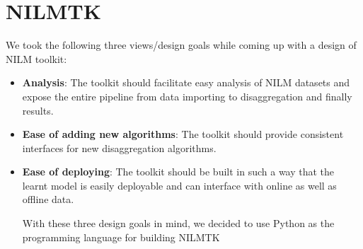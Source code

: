 \documentclass{sig-alternate}
\begin{document}
\section{NILMTK}
We took the following three views/design goals while coming up with a design of NILM toolkit:
\begin{itemize}
\item \textbf{Analysis}: The toolkit should facilitate easy analysis of NILM datasets and expose the entire pipeline from data importing to disaggregation and finally results. 
\item \textbf{Ease of adding new algorithms}: The toolkit should provide consistent interfaces for new disaggregation algorithms.
\item \textbf{Ease of deploying}: The toolkit should be built in such a way that the learnt model is easily deployable and can interface with online as well as offline data.

With these three design goals in mind, we decided to use Python as the programming language for building NILMTK
\end{itemize}
\end{document}
